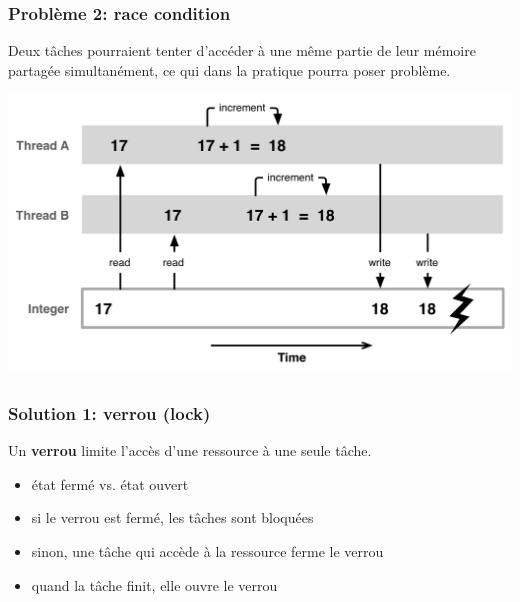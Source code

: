 \documentclass{beamer}
\begin{document}
\begin{frame} 
  \frametitle{Problème 2: \textbf{race condition}}
  \begin{minipage}{.48\textwidth}
    Deux tâches pourraient tenter d'accéder à une même partie
    de leur mémoire partagée simultanément, ce qui dans la pratique
    pourra poser problème.
  \end{minipage}
  \quad
  \begin{minipage}{.45\textwidth}
    \begin{center}
      \includegraphics[width=.7\textwidth]{race-condition.png}      
    \end{center}
  \end{minipage}
\end{frame} %
\begin{frame}
  \frametitle{Solution 1: \textbf{verrou} (lock)}
  Un \textbf{verrou} limite l'accès d'une ressource à une seule tâche.
  \begin{itemize}
  \item état fermé vs. état ouvert
  \item si le verrou est fermé, les tâches sont bloquées
  \item sinon, une tâche qui accède à la ressource ferme le verrou
  \item quand la tâche finit, elle ouvre le verrou
  \end{itemize}
\end{frame} %
\end{document}
